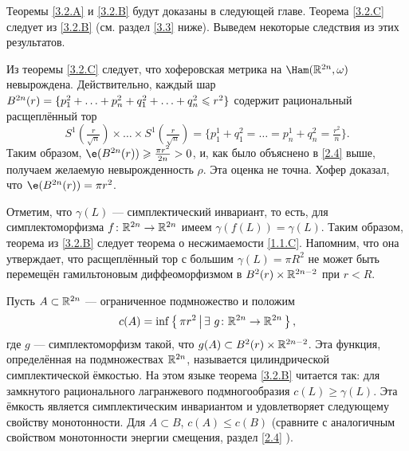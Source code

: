 Теоремы \ref{3.2.A} и \ref{3.2.B} будут доказаны в следующей главе.
Теорема \ref{3.2.C} следует из \ref{3.2.B} (см. раздел \ref{3.3} ниже).
Выведем некоторые следствия из этих результатов.

\begin{thm}{}\label{3.2.D}
\end{thm}

Из теоремы \ref{3.2.C} следует, что хоферовская метрика на $\Ham (\RR^{2n}, \omega)$ невырождена.
Действительно, каждый шар 
$B^{2n}(r) = \{p_1^2 +\z\dots\z+ p_n^2 \z+ q_1^2+\z\dots\z+ q_n^2 \le r^2\}$
содержит рациональный расщеплённый тор 
\[
S^1(\tfrac r{\sqrt{n}}) \times\dots\times S^1(\tfrac r{\sqrt{n}})
=
\{p_1^1+q_1^2=\dots=p_n^1+q_n^2=\tfrac{r^2}{n}\}.
\]
Таким образом, $\e (B^{2n} (r)) \ge \tfrac{\pi r^2}{2n}> 0$, и, как было объяснено в \ref{2.4} выше, получаем желаемую невырожденность $\rho$.
Эта оценка не точна.
Хофер \cite{H1} доказал, что $\e (B^{2n} (r)) = \pi r^2$.

\begin{thm}{}\label{3.2.E} 
\end{thm}

Отметим, что $\gamma (L)$ --- симплектический инвариант, то есть, для симплектоморфизма $f\colon \mathbb{R}^{2n} \to \mathbb{R}^{2n}$ имеем $\gamma (f (L)) = \gamma (L)$.
Таким образом, теорема из \ref{3.2.B} следует теорема о несжимаемости \ref{1.1.C}.
Напомним, что она утверждает, что расщеплённый тор с большим $\gamma (L) = \pi R^2$ не может быть перемещён гамильтоновым диффеоморфизмом в $B^2 (r) \times \mathbb{R}^{2n - 2}$ при $r<R$.

\begin{thm}{}\label{3.2.F}
\end{thm}

Пусть $A \subset \mathbb{R}^{2n}$ --- ограниченное подмножество и положим 
\[c(A) = \inf \left\{ \,{\pi r^2}\, \middle| \,{ \exists\  g\colon \mathbb{R}^{2n} \to \mathbb{R}^{2n}}\, \right\},\]
где $g$ --- симплектоморфизм такой, что $g (A) \subset B^2 (r) \times \mathbb{R}^{2n - 2}$.
Эта функция, определённая на подмножествах $\mathbb{R}^{2n}$, называется цилиндрической симплектической ёмкостью.
На этом языке теорема \ref{3.2.B} читается так:
для замкнутого рационального лагранжевого подмногообразия $c(L) \ge \gamma (L)$.
Эта ёмкость является симплектическим инвариантом и удовлетворяет следующему свойству монотонности.
Для $A \subset B$, $c (A) \le c (B)$ (сравните с аналогичным свойством монотонности энергии смещения, раздел \ref{2.4} ).

